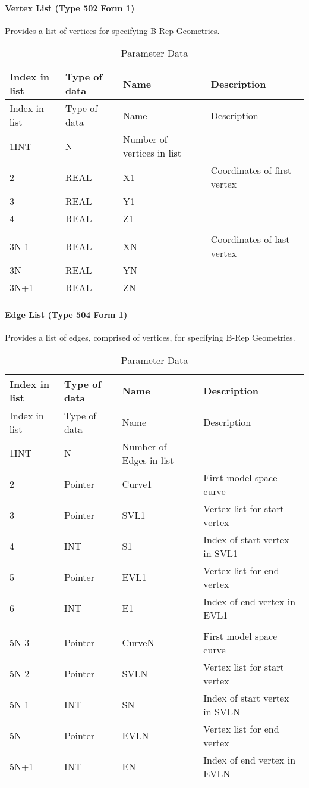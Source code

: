 \paragraph{Vertex List (Type 502 Form
1)}\label{vertex-list-type-502-form-1}

Provides a list of vertices for specifying B-Rep Geometries.

\begin{longtable}[c]{@{}llll@{}}
\caption{Parameter Data}\tabularnewline
\toprule
Index in list & Type of data & Name & Description\tabularnewline
\midrule
\endfirsthead
\toprule
Index in list & Type of data & Name & Description\tabularnewline
\midrule
\endhead
1\textbar{}INT & N & Number of vertices in list\tabularnewline
2 & REAL & X1 & Coordinates of first vertex\tabularnewline
3 & REAL & Y1 &\tabularnewline
4 & REAL & Z1 &\tabularnewline
\vtop{\hbox{\strut .}\hbox{\strut .}} &
\vtop{\hbox{\strut .}\hbox{\strut .}} &
\vtop{\hbox{\strut .}\hbox{\strut .}} &\tabularnewline
3N-1 & REAL & XN & Coordinates of last vertex\tabularnewline
3N & REAL & YN &\tabularnewline
3N+1 & REAL & ZN &\tabularnewline
\bottomrule
\end{longtable}

\paragraph{Edge List (Type 504 Form 1)}\label{edge-list-type-504-form-1}

Provides a list of edges, comprised of vertices, for specifying B-Rep
Geometries.

\begin{longtable}[c]{@{}llll@{}}
\caption{Parameter Data}\tabularnewline
\toprule
Index in list & Type of data & Name & Description\tabularnewline
\midrule
\endfirsthead
\toprule
Index in list & Type of data & Name & Description\tabularnewline
\midrule
\endhead
1\textbar{}INT & N & Number of Edges in list\tabularnewline
2 & Pointer & Curve1 & First model space curve\tabularnewline
3 & Pointer & SVL1 & Vertex list for start vertex\tabularnewline
4 & INT & S1 & Index of start vertex in SVL1\tabularnewline
5 & Pointer & EVL1 & Vertex list for end vertex\tabularnewline
6 & INT & E1 & Index of end vertex in EVL1\tabularnewline
\vtop{\hbox{\strut .}\hbox{\strut .}} &
\vtop{\hbox{\strut .}\hbox{\strut .}} &
\vtop{\hbox{\strut .}\hbox{\strut .}} &\tabularnewline
5N-3 & Pointer & CurveN & First model space curve\tabularnewline
5N-2 & Pointer & SVLN & Vertex list for start vertex\tabularnewline
5N-1 & INT & SN & Index of start vertex in SVLN\tabularnewline
5N & Pointer & EVLN & Vertex list for end vertex\tabularnewline
5N+1 & INT & EN & Index of end vertex in EVLN\tabularnewline
\bottomrule
\end{longtable}

